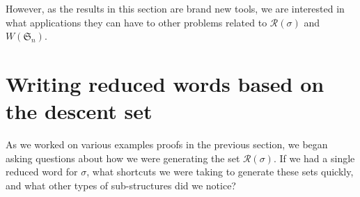 \documentclass[11pt,reqno]{amsart}
\theoremstyle{definition}
\theoremstyle{notation}
\newcommand{\calR}{\mathcal{R}}
\newcommand{\Sym}{\mathfrak{S}}
\begin{document}
However, as the results in this section are brand new tools, we are interested in what applications they can have to other problems related to $\calR(\sigma)$ and $W(\Sym_n)$.

\section{Writing reduced words based on the descent set}\label{sec:shuffle_sub}%

As we worked on various examples proofs in the previous section, we began asking questions about how we were generating the set $\calR(\sigma)$. If we had a single reduced word for $\sigma$, what shortcuts we were taking to generate these sets quickly, and what other types of sub-structures did we notice?
\end{document}
